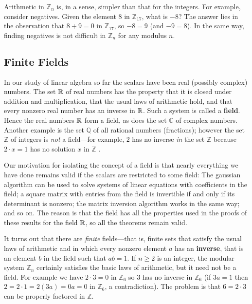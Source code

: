 Arithmetic in $\mathbb{Z}_n$ is, in a sense, simpler than that for the integers. For example, consider negatives. Given the element $8$ in $\mathbb{Z}_{17}$, what is $-8$? The answer lies in the observation that $8 + 9 = 0$ in $\mathbb{Z}_{17}$, so $-8 = 9$ (and $-9 = 8$). In the same way, finding negatives is not difficult in $\mathbb{Z}_n$ for any modulus $n$.

\subsection*{Finite Fields}

In our study of linear algebra so far the scalars have been real (possibly complex) numbers. The set $\mathbb{R}$ of real numbers has the property that it is closed under addition and multiplication, that the usual laws of arithmetic hold, and that every nonzero real number has an inverse in $\mathbb{R}$. Such a system is called a \textbf{field}. Hence the real numbers $\mathbb{R}$ form a field, as does the set $\mathbb{C}$  of complex numbers. Another example is the set $\mathbb{Q}$  of all rational numbers (fractions); however the set $\mathbb{Z}$  of integers is \textit{not} a field---for example, $2$ has no inverse \textit{in} the set $\mathbb{Z}$  because $2 \cdot x = 1$ has no solution $x$ in $\mathbb{Z}$ .

Our motivation for isolating the concept of a field is that nearly everything we have done remains valid if the scalars are restricted to some field: The gaussian algorithm can be used to solve systems of linear equations with coefficients in the field; a square matrix with entries from the field is invertible if and only if its determinant is nonzero; the matrix inversion algorithm works in the same way; and so on. The reason is that the field has all the properties used in the proofs of these results for the field $\mathbb{R}$, so all the theorems remain valid.

It turns out that there are \textit{finite} fields---that is, finite sets that satisfy the usual laws of arithmetic and in which every nonzero element $a$ has an \textbf{inverse}, that is an element $b$ in the field such that $ab = 1$. If $n \geq 2$ is an integer, the modular system $\mathbb{Z}_n$ certainly satisfies the basic laws of arithmetic, but it need not be a field. For example we have $2 \cdot 3 = 0$ in $\mathbb{Z}_6$ so $3$ has no inverse in $\mathbb{Z}_6$ (if $3a = 1$ then $2 = 2 \cdot 1 = 2(3a) = 0a = 0$ in $\mathbb{Z}_6$, a contradiction). The problem is that $6 = 2 \cdot 3$ can be properly factored in $\mathbb{Z}$.


